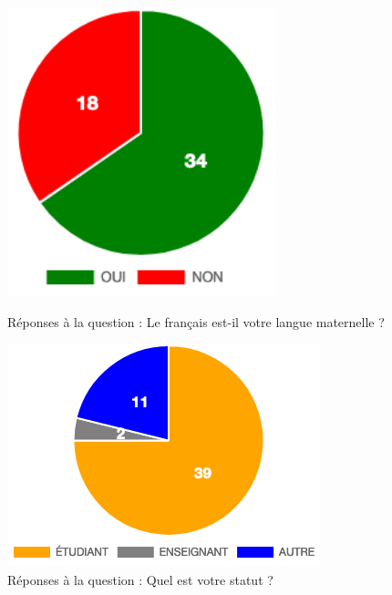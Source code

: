 \documentclass[11pt,letterpaper]{article}
\begin{document}
\begin{figure}[htb]
    \begin{minipage}[t]{.45\textwidth}
        \centering
        \includegraphics[width=0.69\textwidth]{figures/langueM.png}
        \caption{Réponses à la question : \og Le français est-il votre langue maternelle ?\fg{}}\label{fig:langueM}
    \end{minipage}
    \hfill
    \begin{minipage}[t]{.45\textwidth}
        \centering
        \includegraphics[width=\textwidth]{figures/statut.png}
        \caption{Réponses à la question : \og Quel est votre statut ?\fg{}}\label{fig:statut}
    \end{minipage} 
\end{figure}
\end{document}
